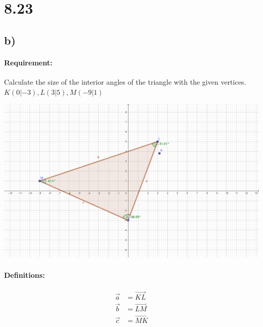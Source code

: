 \section{8.23}
\subsection{b)}
\paragraph{Requirement:}
Calculate the size of the interior angles of the triangle with the given
vertices. \\
$K(0|-3), L(3|5), M(-9|1)$

\includegraphics[width=\linewidth]{images/8-23.png}

\paragraph{Definitions:}
\begin{align}
   \vec{a} &= \vec{KL} \\ 
   \vec{b} &= \vec{LM} \\ 
   \vec{c} &= \vec{MK}
\end{align}

\def\va{\begin{pmatrix}
   3 \\ 
   8
\end{pmatrix}}
\def\vb{\begin{pmatrix}
   -12 \\ 
   -4
\end{pmatrix}}
\def\vc{\begin{pmatrix}
   9 \\ 
   -4
\end{pmatrix}}


